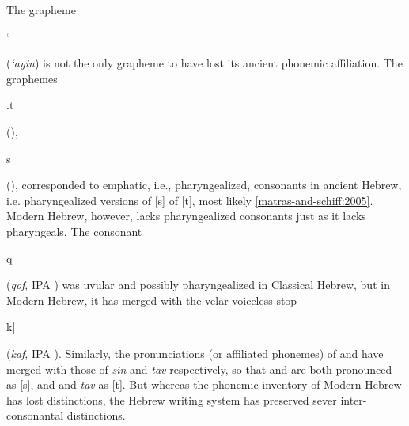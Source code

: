 The grapheme \begin{cjhebrew}`\end{cjhebrew} (\textit{`ayin}) is not the only 
grapheme to have 
lost its ancient phonemic affiliation. 
The graphemes \begin{cjhebrew}.t\end{cjhebrew} 
(\textit{}), \begin{cjhebrew}s\end{cjhebrew} 
(\textit{}), corresponded to emphatic, i.e., 
pharyngealized, consonants in ancient 
Hebrew, i.e. pharyngealized versions of [s] of [t], most likely 
\ref{matras-and-schiff:2005}.
Modern Hebrew, however, lacks pharyngealized consonants just as 
it lacks pharyngeals. 
The consonant \begin{cjhebrew}q\end{cjhebrew} (\textit{qof}, 
IPA \textipa{[q]}) was uvular and 
possibly pharyngealized in Classical Hebrew, but in Modern Hebrew, 
it has merged with the velar voiceless stop
\begin{cjhebrew}k|\end{cjhebrew} (\textit{kaf}, IPA \textipa{[k]}).
Similarly, the pronunciations (or affiliated phonemes) of 
\textit{} and \textit{} 
have merged with those of \textit{sin} and \textit{tav} respectively, 
 so that \textit{} and \textit{} 
 are both pronounced as [s], and \textit{} and 
 \textit{tav} as [t]. But whereas the phonemic inventory of 
 Modern Hebrew has lost distinctions, the Hebrew writing system has preserved sever inter-consonantal distinctions.

